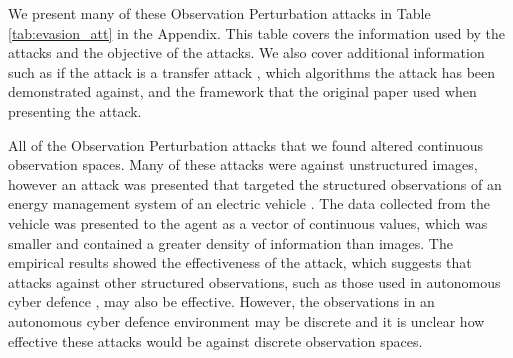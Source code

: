 \documentclass[conference,compsoc]{IEEEtran}
\begin{document}
We present many of these Observation Perturbation attacks in Table \ref{tab:evasion_att} in the Appendix. This table covers the information used by the attacks and the objective of the attacks. We also cover additional information such as if the attack is a transfer attack \cite{demontis_why_2019}, which algorithms the attack has been demonstrated against, and the framework that the original paper used when presenting the attack.

All of the Observation Perturbation attacks that we found altered continuous observation spaces. Many of these attacks were against unstructured images, however an attack was presented that targeted the structured observations of an energy management system of an electric vehicle \cite{wang_adversarial_2020}. The data collected from the vehicle was presented to the agent as a vector of continuous values, which was smaller and contained a greater density of information than images. The empirical results showed the effectiveness of the attack, which suggests that attacks against other structured observations, such as those used in autonomous cyber defence \cite{standen_cyborg_2021}, may also be effective. However, the observations in an autonomous cyber defence environment may be discrete and it is unclear how effective these attacks would be against discrete observation spaces.


\end{document}
